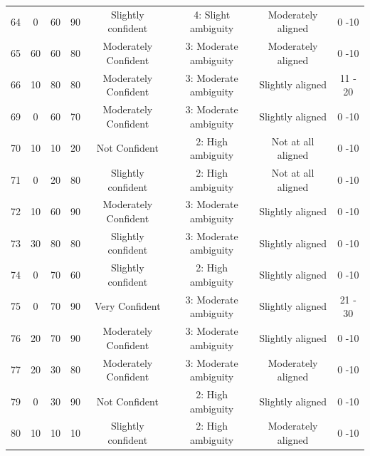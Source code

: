 \documentclass[11pt]{article}
\begin{document}
\begin{landscape}
{\begin{longtable}{cccccccc}
64 & 0 & 60 & 90 & Slightly confident & 4: Slight ambiguity & Moderately aligned & 0 -10 \\
65 & 60 & 60 & 80 & Moderately Confident & 3: Moderate ambiguity & Moderately aligned & 0 -10 \\
66 & 10 & 80 & 80 & Moderately Confident & 3: Moderate ambiguity & Slightly aligned & 11 - 20 \\
69 & 0 & 60 & 70 & Moderately Confident & 3: Moderate ambiguity & Slightly aligned & 0 -10 \\
70 & 10 & 10 & 20 & Not Confident & 2: High ambiguity & Not at all aligned & 0 -10 \\
71 & 0 & 20 & 80 & Slightly confident & 2: High ambiguity & Not at all aligned & 0 -10 \\
72 & 10 & 60 & 90 & Moderately Confident & 3: Moderate ambiguity & Slightly aligned & 0 -10 \\
73 & 30 & 80 & 80 & Slightly confident & 3: Moderate ambiguity & Slightly aligned & 0 -10 \\
74 & 0 & 70 & 60 & Slightly confident & 2: High ambiguity & Slightly aligned & 0 -10 \\
75 & 0 & 70 & 90 & Very Confident & 3: Moderate ambiguity & Slightly aligned & 21 - 30 \\
76 & 20 & 70 & 90 & Moderately Confident & 3: Moderate ambiguity & Slightly aligned & 0 -10 \\
77 & 20 & 30 & 80 & Moderately Confident & 3: Moderate ambiguity & Moderately aligned & 0 -10 \\
79 & 0 & 30 & 90 & Not Confident & 2: High ambiguity & Slightly aligned & 0 -10 \\
80 & 10 & 10 & 10 & Slightly confident & 2: High ambiguity & Moderately aligned & 0 -10 \\

\end{longtable}
}
\end{landscape}



\end{document}
